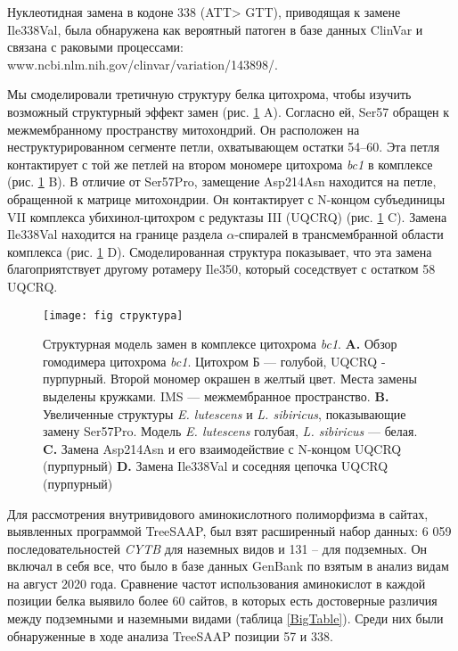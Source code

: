 Нуклеотидная замена в кодоне 338 (ATT> GTT), приводящая к замене Ile338Val, была обнаружена как вероятный патоген в базе данных ClinVar и связана с раковыми процессами: www.ncbi.nlm.nih.gov/clinvar/variation/143898/.

Мы смоделировали третичную структуру белка цитохрома, чтобы изучить возможный структурный эффект замен (рис. \ref{CytStructure} A). Согласно ей, Ser57 обращен к межмембранному пространству митохондрий. Он расположен на неструктурированном сегменте петли, охватывающем остатки 54–60. Эта петля контактирует с той же петлей на втором мономере цитохрома \textit{bc1} в комплексе (рис. \ref{CytStructure} B). В отличие от Ser57Pro, замещение Asp214Asn находится на петле, обращенной к матрице митохондрии. Он контактирует с N-концом субъединицы VII комплекса убихинол-цитохром с редуктазы III (UQCRQ) (рис. \ref{CytStructure} C). Замена Ile338Val находится на границе раздела $\alpha$-спиралей в трансмембранной области комплекса (рис. \ref{CytStructure} D). Смоделированная структура показывает, что эта замена благоприятствует другому ротамеру Ile350, который соседствует с остатком 58 UQCRQ.

\begin{figure}[h!]
	\begin{center}
		\texttt{[image: fig структура]}
	\end{center}
	\caption{Структурная модель замен в комплексе цитохрома \textit{bc1}. \textbf{A.} Обзор гомодимера цитохрома \textit{bc1}. Цитохром Б --- голубой, UQCRQ - пурпурный. Второй мономер окрашен в желтый цвет. Места замены выделены кружками. IMS --- межмембранное пространство. \textbf{B.} Увеличенные структуры \textit{E. lutescens} и \textit{L. sibiricus}, показывающие замену Ser57Pro. Модель \textit{E. lutescens} голубая, \textit{L. sibiricus} --- белая. \textbf{C.} Замена Asp214Asn и его взаимодействие с N-концом UQCRQ (пурпурный) \textbf{D.} Замена Ile338Val и соседняя цепочка UQCRQ (пурпурный)}
	\label{CytStructure}
\end{figure}

Для рассмотрения внутривидового аминокислотного полиморфизма в сайтах, выявленных программой TreeSAAP, был взят расширенный набор данных: 6 059 последовательностей \textit{CYTB} для наземных видов и 131 -- для подземных. Он включал в себя все, что было в базе данных GenBank по взятым в анализ видам на август 2020 года. Сравнение частот использования аминокислот в каждой позиции белка выявило более 60 сайтов, в которых есть достоверные различия между подземными и наземными видами (таблица \ref{BigTable}). Среди них были обнаруженные в ходе анализа TreeSAAP позиции 57 и 338.

